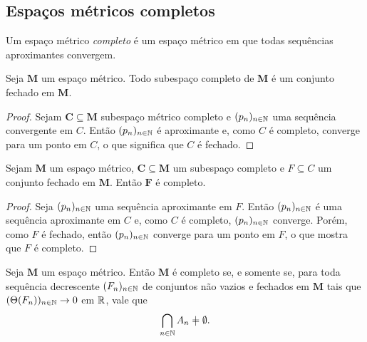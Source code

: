 \subsection{Espaços métricos completos}

\begin{definition}
Um espaço métrico \emph{completo} é um espaço métrico em que todas sequências aproximantes convergem.
\end{definition}

\begin{proposition}
Seja $\bm M$ um espaço métrico. Todo subespaço completo de $\bm M$ é um conjunto fechado em $\bm M$.
\end{proposition}
\begin{proof}
Sejam $\bm C \subseteq \bm M$ subespaço métrico completo e $(p_n)_{n \in \mathbb{N}}$ uma sequência convergente em $C$. Então $(p_n)_{n \in \mathbb{N}}$ é aproximante e, como $C$ é completo, converge para um ponto em $C$, o que significa que $C$ é fechado.
\end{proof}

\begin{proposition}
Sejam $\bm M$ um espaço métrico, $\bm C \subseteq \bm M$ um subespaço completo e $F \subseteq C$ um conjunto fechado em $\bm M$. Então $\bm F$ é completo.
\end{proposition}
\begin{proof}
Seja $(p_n)_{n \in \mathbb{N}}$ uma sequência aproximante em $F$. Então $(p_n)_{n \in \mathbb{N}}$ é uma sequência aproximante em $C$ e, como $C$ é completo, $(p_n)_{n \in \mathbb{N}}$ converge. Porém, como $F$ é fechado, então $(p_n)_{n \in \mathbb{N}}$ converge para um ponto em $F$, o que mostra que $F$ é completo.
\end{proof}

\begin{theorem}
Seja $\bm M$ um espaço métrico. Então $\bm M$ é completo se, e somente se, para toda sequência decrescente $(F_n)_{n \in \mathbb{N}}$ de conjuntos não vazios e fechados em $\bm M$ tais que $(\Theta(F_n))_{n \in \mathbb{N}} \rightarrow 0$ em $\mathbb{R}$, vale que
	\begin{equation*}
	\bigcap_{n \in \N} A_n \neq \emptyset.
	\end{equation*}
\end{theorem}

